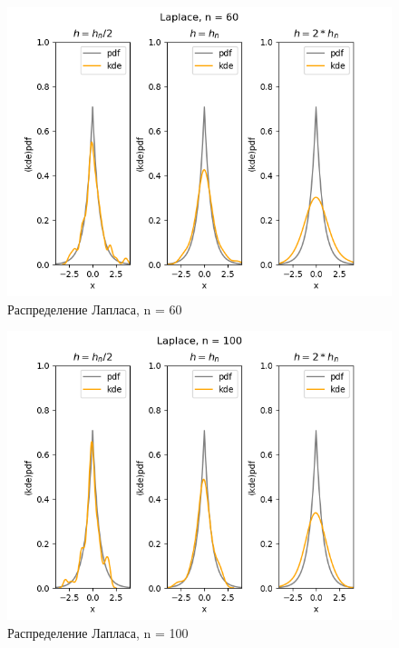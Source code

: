 \documentclass[../body.tex]{subfiles}
\begin{document}
\begin{figure}[H]
	\centering
	\includegraphics[width=\textwidth, height =0.4\textheight]{img/LaplaceKDE n = 60.png}
	\caption{Распределение Лапласа, n = 60}
	\label{fig:laplace_kde_60}
\end{figure}

\begin{figure}[H]
	\centering
	\includegraphics[width=\textwidth, height =0.4\textheight]{img/LaplaceKDE n = 100.png}
	\caption{Распределение Лапласа, n = 100}
	\label{fig:laplace_kde_100}
\end{figure}
\end{document}
